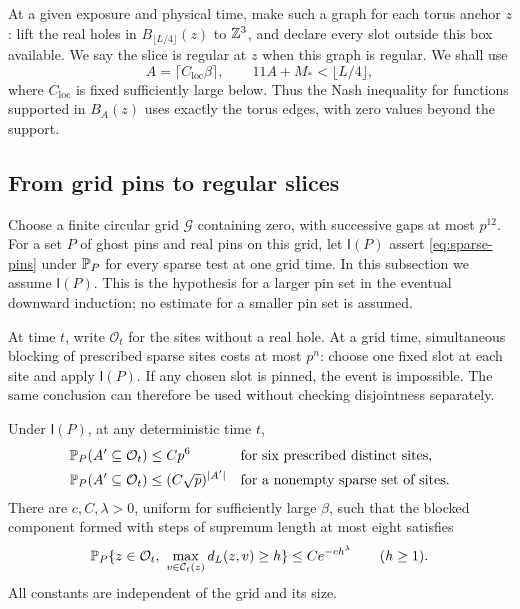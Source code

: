 At a given exposure and physical time, make such a graph for each
torus anchor \(z\): lift the real holes in \(B_{\lfloor L/4\rfloor}(z)\)
to \(\mathbb Z^3\), and declare every slot outside this box available.
We say the slice is regular at \(z\) when this graph is regular.
We shall use
\begin{equation}\label{eq:sparse-localization-radius}
 A=\lceil C_{\mathrm{loc}}\beta\rceil,
 \qquad 11A+M_*<\lfloor L/4\rfloor,
\end{equation}
where \(C_{\mathrm{loc}}\) is fixed sufficiently large below.
Thus the Nash inequality for functions supported in \(B_A(z)\)
uses exactly the torus edges, with zero values beyond the support.

\subsection{From grid pins to regular slices}

Choose a finite circular grid \(\mathcal G\) containing zero, with
successive gaps at most \(p^{12}\).  For a set \(P\) of ghost pins
and real pins on this grid, let \(\mathsf I(P)\) assert
\eqref{eq:sparse-pins} under \(\mathbb P_P\) for every sparse test at
one grid time.  In this subsection we assume \(\mathsf I(P)\).
This is the hypothesis for a larger pin set in the eventual downward
induction; no estimate for a smaller pin set is assumed.

At time \(t\), write \(\mathcal O_t\) for the sites without a real
hole.  At a grid time, simultaneous blocking of prescribed sparse
sites costs at most \(p^n\): choose one fixed slot at each site and
apply \(\mathsf I(P)\).  If any chosen slot is pinned, the event is
impossible.  The same conclusion can therefore be used without
checking disjointness separately.

\begin{lemma}\label{lem:torus-blocking}
Under \(\mathsf I(P)\), at any deterministic time \(t\),
\begin{align}
 \mathbb P_P(A'\subseteq\mathcal O_t)&\le Cp^6
 &&\text{for six prescribed distinct sites},\label{eq:six-blocking}\\
 \mathbb P_P(A'\subseteq\mathcal O_t)&\le(C\sqrt p)^{|A'|}
 &&\text{for a nonempty sparse set of sites}.\label{eq:sparse-blocking}
\end{align}
There are \(c,C,\lambda>0\), uniform for sufficiently large \(\beta\),
such that the blocked component formed with steps of supremum length
at most eight satisfies
\begin{equation}\label{eq:torus-component-tail}
 \PP_P\{z\in\mathcal O_t,\ 
       \max_{v\in\mathcal C_t(z)}d_L(z,v)\ge h\}
       \le C e^{-ch^\lambda}\qquad(h\ge1).
\end{equation}
All constants are independent of the grid and its size.
\end{lemma}

